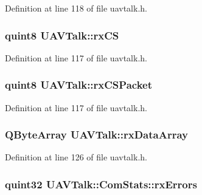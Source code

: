 \-Definition at line 118 of file uavtalk.\-h.

\hypertarget{group___u_a_v_talk_plugin_gabfde70d24df43bcff2ab3c3da3f2444f}{
\subsubsection[{rx\-C\-S}]{\setlength{\rightskip}{0pt plus 5cm}quint8 {\bf \-U\-A\-V\-Talk\-::rx\-C\-S}}}\label{group___u_a_v_talk_plugin_gabfde70d24df43bcff2ab3c3da3f2444f}


\-Definition at line 117 of file uavtalk.\-h.

\hypertarget{group___u_a_v_talk_plugin_gab6dc6fd77ce7d02c121d7c197dfdebd2}{
\subsubsection[{rx\-C\-S\-Packet}]{\setlength{\rightskip}{0pt plus 5cm}quint8 {\bf \-U\-A\-V\-Talk\-::rx\-C\-S\-Packet}}}\label{group___u_a_v_talk_plugin_gab6dc6fd77ce7d02c121d7c197dfdebd2}


\-Definition at line 117 of file uavtalk.\-h.

\hypertarget{group___u_a_v_talk_plugin_ga053813b68171430545f1bc1d69d450a0}{
\subsubsection[{rx\-Data\-Array}]{\setlength{\rightskip}{0pt plus 5cm}\-Q\-Byte\-Array {\bf \-U\-A\-V\-Talk\-::rx\-Data\-Array}}}\label{group___u_a_v_talk_plugin_ga053813b68171430545f1bc1d69d450a0}


\-Definition at line 126 of file uavtalk.\-h.

\hypertarget{group___u_a_v_talk_plugin_ga52c1d5163810f507e6ca052884ee7ecc}{
\subsubsection[{rx\-Errors}]{\setlength{\rightskip}{0pt plus 5cm}quint32 {\bf \-U\-A\-V\-Talk\-::\-Com\-Stats\-::rx\-Errors}}}\label{group___u_a_v_talk_plugin_ga52c1d5163810f507e6ca052884ee7ecc}



